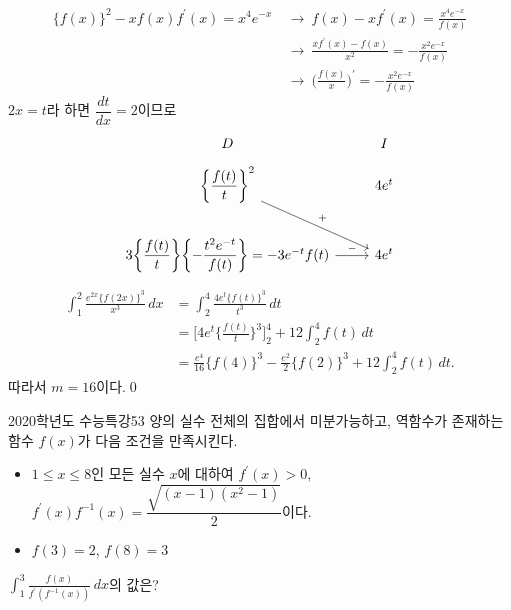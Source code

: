 \documentclass{article}
\begin{document}
\begin{sol}
	\[
		\begin{aligned}
			\{f(x)\}^2-xf(x)f^{\prime}(x)=x^4e^{-x}~&\longrightarrow~f(x)-xf^{\prime}(x)=\frac{x^4e^{-x}}{f(x)}\\[3pt]
			&\longrightarrow~\frac{xf^{\prime}(x)-f(x)}{x^2}=-\frac{x^2e^{-x}}{f(x)}\\[3pt]
			&\longrightarrow~\biggl(\frac{f(x)}{x}\biggr)^{\prime}=-\frac{x^2e^{-x}}{f(x)}
		\end{aligned}
	\]
	$2x=t$라 하면 $\dfrac{dt}{dx}=2$이므로
	\[
		\begin{tikzcd}
			D & I \\[-12pt]
			\biggl\{\dfrac{f(t)}{t}\biggr\}^2 \arrow[rd, "+"] & 4e^t \\
			3\biggl\{\dfrac{f(t)}{t}\biggr\}\biggl\{-\dfrac{t^2e^{-t}}{f(t)}\biggr\}=-3e^{-t}f(t) \arrow[r, "-"] & 4e^t
		\end{tikzcd}
	\]
	\[
		\begin{aligned}
			\int_1^2\frac{e^{2x}\{f(2x)\}^3}{x^3}\,dx&=\int_2^4\frac{4e^t\{f(t)\}^3}{t^3}\,dt\\[3pt]
			&=\biggl[4e^t\biggl\{\frac{f(t)}{t}\biggr\}^3\biggr]_2^4+12\int_2^4f(t)\,dt\\[3pt]
			&=\frac{e^4}{16}\{f(4)\}^3-\frac{e^2}{2}\{f(2)\}^3+12\int_2^4f(t)\,dt.
		\end{aligned}
	\]
	따라서 $m=16$이다.\qed
\end{sol}

\newpage
\begin{prob}{2020학년도 수능특강}{53}
	양의 실수 전체의 집합에서 미분가능하고, 역함수가 존재하는 함수 $f(x)$가 다음 조건을 만족시킨다.
	\begin{hint}
		\begin{itemize}
			\item[(가)] $1\leq x\leq 8$인 모든 실수 $x$에 대하여 $f^{\prime}(x)>0$, $f^{\prime}(x)f^{-1}(x)=\dfrac{\sqrt{(x-1)(x^2-1)}}{2}$이다.
			\item[(나)] $f(3)=2$, $f(8)=3$
		\end{itemize}
	\end{hint}
	$\displaystyle\int_1^3\frac{f(x)}{f^{\prime}(f^{-1}(x))}\,dx$의 값은?
\end{prob}
\end{document}
